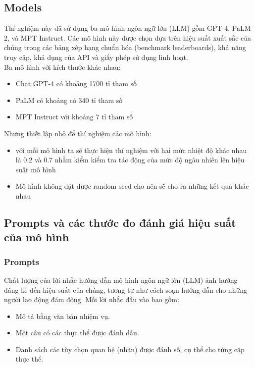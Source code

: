 \documentclass{article} %
\begin{document}
\subsection{Models}
\hspace{10pt} Thí nghiệm này đã sử dụng ba mô hình ngôn ngữ lớn (LLM) gồm GPT-4, PaLM 2, và MPT Instruct. 
Các mô hình này được chọn dựa trên hiệu suất xuất sắc của chúng trong các bảng xếp hạng chuẩn hóa (benchmark leaderboards), 
khả năng truy cập, khả dụng của API và giấy phép sử dụng linh hoạt.\\
Ba mô hình với kích thước khác nhau: 
\begin{itemize}
    \item Chat GPT-4 có khoảng 1700 tỉ tham số
    \item PaLM có khoảng có 340 tỉ tham số
    \item MPT Instruct với khoảng 7 tỉ tham số
\end{itemize}
Những thiết lập nhỏ để thí nghiệm các mô hình:
\begin{itemize}
    \item với mỗi mô hình ta sẽ thực hiện thí nghiệm với hai mức nhiệt độ khác nhau là 0.2 và 0.7 nhằm kiểm kiểm tra tác
động của mức độ ngâu nhiên lên hiệu suất mô hình  %
    \item Mô hình không đặt được random seed cho nên sẽ cho ra những kết quả khác nhau %
\end{itemize}

\subsection{Prompts và các thước đo đánh giá hiệu suất của mô hình}
\subsubsection{Prompts}
Chất lượng của lời nhắc hướng dẫn mô hình ngôn ngữ lớn (LLM) ảnh hưởng đáng kể đến hiệu suất của chúng, tương tự như cách soạn hướng dẫn cho những người lao động đám đông.
Mỗi lời nhắc đầu vào bao gồm: 
\begin{itemize}
    \item Mô tả bằng văn bản nhiệm vụ.
    \item Một câu có các thực thể được đánh dấu.
    \item Danh sách các tùy chọn quan hệ (nhãn) được đánh số, cụ thể cho từng cặp thực thể.
\end{itemize}
\end{document}
